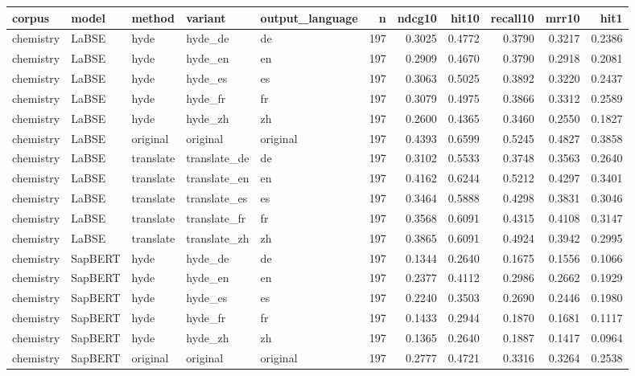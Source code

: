 \begin{tabular}{lllllrrrrrr}
\toprule
corpus & model & method & variant & output\_language & n & ndcg10 & hit10 & recall10 & mrr10 & hit1 \\
\midrule
chemistry & LaBSE & hyde & hyde\_de & de & 197 & 0.3025 & 0.4772 & 0.3790 & 0.3217 & 0.2386 \\
chemistry & LaBSE & hyde & hyde\_en & en & 197 & 0.2909 & 0.4670 & 0.3790 & 0.2918 & 0.2081 \\
chemistry & LaBSE & hyde & hyde\_es & es & 197 & 0.3063 & 0.5025 & 0.3892 & 0.3220 & 0.2437 \\
chemistry & LaBSE & hyde & hyde\_fr & fr & 197 & 0.3079 & 0.4975 & 0.3866 & 0.3312 & 0.2589 \\
chemistry & LaBSE & hyde & hyde\_zh & zh & 197 & 0.2600 & 0.4365 & 0.3460 & 0.2550 & 0.1827 \\
chemistry & LaBSE & original & original & original & 197 & 0.4393 & 0.6599 & 0.5245 & 0.4827 & 0.3858 \\
chemistry & LaBSE & translate & translate\_de & de & 197 & 0.3102 & 0.5533 & 0.3748 & 0.3563 & 0.2640 \\
chemistry & LaBSE & translate & translate\_en & en & 197 & 0.4162 & 0.6244 & 0.5212 & 0.4297 & 0.3401 \\
chemistry & LaBSE & translate & translate\_es & es & 197 & 0.3464 & 0.5888 & 0.4298 & 0.3831 & 0.3046 \\
chemistry & LaBSE & translate & translate\_fr & fr & 197 & 0.3568 & 0.6091 & 0.4315 & 0.4108 & 0.3147 \\
chemistry & LaBSE & translate & translate\_zh & zh & 197 & 0.3865 & 0.6091 & 0.4924 & 0.3942 & 0.2995 \\
chemistry & SapBERT & hyde & hyde\_de & de & 197 & 0.1344 & 0.2640 & 0.1675 & 0.1556 & 0.1066 \\
chemistry & SapBERT & hyde & hyde\_en & en & 197 & 0.2377 & 0.4112 & 0.2986 & 0.2662 & 0.1929 \\
chemistry & SapBERT & hyde & hyde\_es & es & 197 & 0.2240 & 0.3503 & 0.2690 & 0.2446 & 0.1980 \\
chemistry & SapBERT & hyde & hyde\_fr & fr & 197 & 0.1433 & 0.2944 & 0.1870 & 0.1681 & 0.1117 \\
chemistry & SapBERT & hyde & hyde\_zh & zh & 197 & 0.1365 & 0.2640 & 0.1887 & 0.1417 & 0.0964 \\
chemistry & SapBERT & original & original & original & 197 & 0.2777 & 0.4721 & 0.3316 & 0.3264 & 0.2538 \\

\end{tabular}
